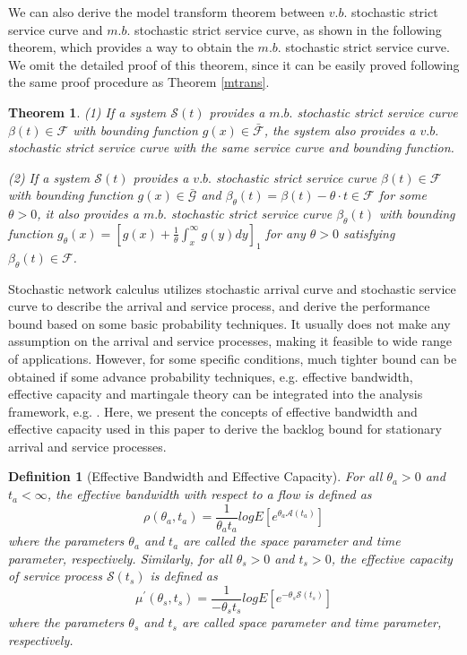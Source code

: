 \documentclass[12pt]{article}
\newtheorem{theorem}{Theorem}
\newtheorem{definition}{Definition}
\begin{document}
We can also derive the model transform theorem between $v.b.$ stochastic strict service curve and $m.b.$ stochastic strict service curve, as shown in the following theorem, which provides a way to obtain the $m.b.$ stochastic strict service curve. We omit the detailed proof of this theorem, since it can be easily proved following the same proof procedure as Theorem \ref{mtrans}.
\begin{theorem}\label{mtrans2}
(1) If a system $\mathcal{S}(t)$ provides a $m.b.$ stochastic strict service curve $\beta(t)\in\mathcal{F}$ with bounding function $g(x)\in\bar{\mathcal{F}}$, the system also provides a $v.b.$ stochastic strict service curve with the same service curve and bounding function.

(2) If a system $\mathcal{S}(t)$ provides a $v.b.$ stochastic strict service curve $\beta(t)\in\mathcal{F}$ with bounding function $g(x)\in\bar{\mathcal{G}}$ and $\beta_{\theta}(t)=\beta(t)-\theta\cdot t\in\mathcal{F}$ for some $\theta>0$, it also provides a $m.b.$ stochastic strict service curve $\beta_{\theta}(t)$ with bounding function $g_{\theta}(x)=[g(x)+\frac{1}{\theta}\int_x^\infty g(y)dy]_1$ for any $\theta>0$ satisfying $\beta_{\theta}(t)\in\mathcal{F}$.
\end{theorem}

Stochastic network calculus utilizes stochastic arrival curve and stochastic service curve to describe the arrival and service process, and derive the performance bound based on some basic probability techniques. It usually does not make any assumption on the arrival and service processes, making it feasible to wide range of applications. However, for some specific conditions, much tighter bound can be obtained if some advance probability techniques, e.g. effective bandwidth, effective capacity and martingale theory can be integrated into the analysis framework, e.g. \cite{Li2007Network,5984844,jiang2009network,Ciucu2007Network}. Here, we present the concepts of effective bandwidth \cite{Kelly1996Note} and effective capacity \cite{Wu2003Effective} used in this paper to derive the backlog bound for stationary arrival and service processes.
\begin{definition}[Effective Bandwidth and Effective Capacity]
For all $\theta_a>0$ and $t_a<\infty$, the effective bandwidth with respect to a flow is defined as
$$\rho(\theta_a,t_a)=\frac{1}{\theta_a t_a}log E[e^{\theta_a \mathcal{A}(t_a)}]$$
where the parameters $\theta_a$ and $t_a$ are called the space parameter and time parameter, respectively. Similarly, for all $\theta_s>0$ and $t_s>0$, the effective capacity of service process $\mathcal{S}(t_s)$ is defined as
$$\mu^\prime(\theta_s,t_s)=\frac{1}{-\theta_s t_s}log E[e^{-\theta_s \mathcal{S}(t_s)}]$$
where the parameters $\theta_s$ and $t_s$ are called space parameter and time parameter, respectively.
\end{definition}
\end{document}

